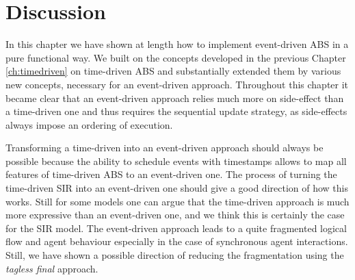 \section{Discussion}
In this chapter we have shown at length how to implement event-driven ABS in a pure functional way. We built on the concepts developed in the previous Chapter \ref{ch:timedriven} on time-driven ABS and substantially extended them by various new concepts, necessary for an event-driven approach. Throughout this chapter it became clear that an event-driven approach relies much more on side-effect than a time-driven one and thus requires the sequential update strategy, as side-effects always impose an ordering of execution.

Transforming a time-driven into an event-driven approach should always be possible because the ability to schedule events with timestamps allows to map all features of time-driven ABS to an event-driven one. The process of turning the time-driven SIR into an event-driven one should give a good direction of how this works. Still for some models one can argue that the time-driven approach is much more expressive than an event-driven one, and we think this is certainly the case for the SIR model. The event-driven approach leads to a quite fragmented logical flow and agent behaviour especially in the case of synchronous agent interactions. Still, we have shown a possible direction of reducing the fragmentation using the \textit{tagless final} approach.

